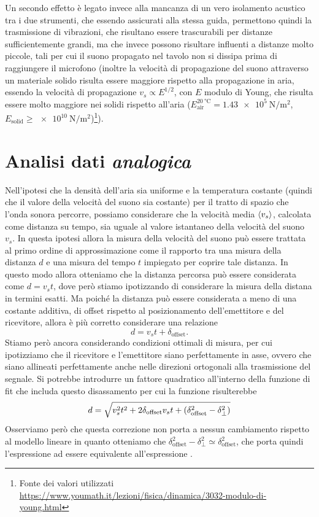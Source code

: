 \documentclass[
    prl,
    reprint, 
    superscriptaddress, 
    altaffilletter, 
    amsmath, 
    amssymb, 
    a4paper,
    varvw]{revtex4-2}
\begin{document}
Un secondo effetto è legato invece alla mancanza di un vero isolamento acustico tra i due strumenti, che essendo assicurati alla stessa guida, permettono quindi la trasmissione di vibrazioni, che risultano essere trascurabili per distanze sufficientemente grandi, ma che invece possono risultare influenti a distanze molto piccole, tali per cui il suono propagato nel tavolo non si dissipa prima di raggiungere il microfono (inoltre la velocità di propagazione del suono attraverso un materiale solido risulta essere maggiore rispetto alla propagazione in aria, essendo la velocità di propagazione $v_s \propto E^{1/2}$, con $E$ modulo di Young, che risulta essere molto maggiore nei solidi rispetto all'aria ($E_\text{air}^{\SI{20}{\celsius}} = \SI{1.43e5}{\newton\per\metre\squared}$, $E_\text{solid} \geq \SI{e10}{\newton\per\metre\squared}$)\footnote{Fonte dei valori utilizzati  \url{https://www.youmath.it/lezioni/fisica/dinamica/3032-modulo-di-young.html}}). 

\section{Analisi dati \emph{analogica}}

Nell'ipotesi che la densità dell'aria sia uniforme e la temperatura costante (quindi che il valore della velocità del suono sia costante) per il tratto di spazio che l'onda sonora percorre, possiamo considerare che la velocità media $\expval{v_s}$, calcolata come distanza su tempo, sia uguale al valore istantaneo della velocità del suono $v_s$. In questa ipotesi allora la misura della velocità del suono può essere trattata al primo ordine di approssimazione come il rapporto tra una misura della distanza $d$ e una misura del tempo $t$ impiegato per coprire tale distanza. In questo modo allora otteniamo che la distanza percorsa può essere considerata come $d=v_st$, dove però stiamo ipotizzando di considerare la misura della distana in termini esatti. Ma poiché la distanza può essere considerata a meno di una costante additiva, di offset rispetto al posizionamento dell'emettitore e del ricevitore, allora è più corretto considerare una relazione \begin{equation}
    d=v_st + \delta_\text{offset}\label{eq:first_order_approx}.
\end{equation} Stiamo però ancora considerando condizioni ottimali di misura, per cui ipotizziamo che il ricevitore e l'emettitore siano perfettamente in asse, ovvero che siano allineati perfettamente anche nelle direzioni ortogonali alla trasmissione del segnale. Si potrebbe introdurre un fattore quadratico all'interno della funzione di fit che includa questo disassamento per cui la funzione risulterebbe \begin{equation}
    d=\sqrt{v_s^2t^2+2\delta_\text{offset}v_st+\qty(\delta_\text{offset}^2-\delta_\perp^2)} \label{eq:second_order_approx}
\end{equation}
Osserviamo però che questa correzione non porta a nessun cambiamento rispetto al modello lineare in quanto otteniamo che $\delta_\text{offset}^2-\delta_\perp^2 \simeq \delta_\text{offset}^2$, che porta quindi l'espressione  ad essere equivalente all'espressione .
\end{document}
